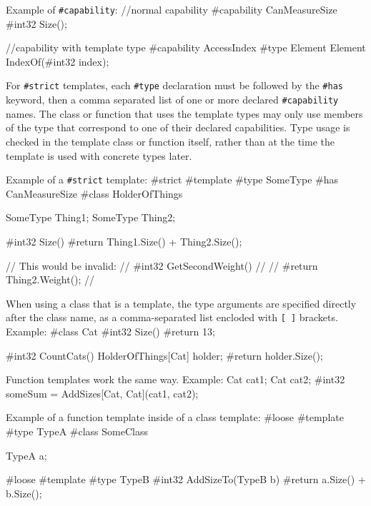 \documentclass{article}
\newcommand{\code}[1]{\colorbox{light-gray}{\texttt{#1}}}
\newenvironment{codebox} {\snugshade\verbatim} {\endverbatim\endsnugshade}
\begin{document}
Example of \code{\#capability}:
\begin{codebox}
//normal capability
#capability CanMeasureSize
{
    #int32 Size();
}

//capability with template type
#capability AccessIndex
#type Element
{
    Element IndexOf(#int32 index);
}
\end{codebox}

For \code{\#strict} templates, each \code{\#type} declaration must be followed by the \code{\#has} keyword, then a comma separated list of one or more declared \code{\#capability} names.  The class or function that uses the template types may only use members of the type that correspond to one of their declared capabilities.  Type usage is checked in the template class or function itself, rather than at the time the template is used with concrete types later.

Example of a \code{\#strict} template:
\begin{codebox}
#strict #template
#type SomeType #has CanMeasureSize
#class HolderOfThings
{
    SomeType Thing1;
    SomeType Thing2;
    
    #int32 Size()
    {
        #return Thing1.Size() + Thing2.Size();
    }
    
// This would be invalid:
//  #int32 GetSecondWeight()
//  {
//      #return Thing2.Weight();
//  }
}
\end{codebox}

When using a class that is a template, the type arguments are specified directly after the class name, as a comma-separated list encloded with \code{[ ]} brackets.  Example:
\begin{codebox}
#class Cat
{
    #int32 Size()
    {
        #return 13;
    }
}

#int32 CountCats()
{
    HolderOfThings[Cat] holder;
    #return holder.Size();
}
\end{codebox}

Function templates work the same way.  Example:
\begin{codebox}
Cat cat1;
Cat cat2;
#int32 someSum = AddSizes[Cat, Cat](cat1, cat2);
\end{codebox}

Example of a function template inside of a class template:
\begin{codebox}
#loose #template
#type TypeA
#class SomeClass
{
    TypeA a;

    #loose #template
    #type TypeB
    #int32 AddSizeTo(TypeB b)
    {
        #return a.Size() + b.Size();
    }
}
\end{codebox}
\end{document}
